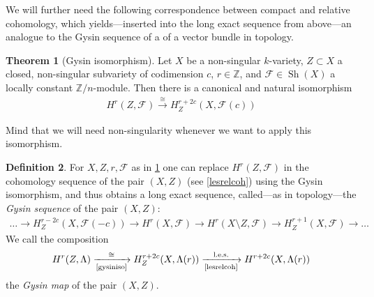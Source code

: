 \documentclass[english]{scrartcl}
\theoremstyle{definition}
\newtheorem{Def}{Definition}[section]
\newtheorem{Thm}[Def]{Theorem}
\theoremstyle{remark}
\newcommand*{\Z}{\mathds{Z}}
\newcommand*{\Zmod}[1]{\Z/#1} %
\newcommand*{\F}{\mathcal{F}} %
\DeclareMathOperator{\Sh}{Sh} %
\begin{document}
We will further need the following correspondence between compact and
relative cohomology, which yields---inserted into the long exact
sequence from above---an analogue to the Gysin sequence of a of a
vector bundle in topology.
\begin{Thm}[Gysin isomorphism]\label{gysiniso}
  Let $X$ be a non-singular $k$-variety,
  $Z\subset X$ a closed, non-singular subvariety of codimension $c$,
  $r\in\Z$,
  and $\F\in\Sh(X)$ a locally constant $\Zmod{n}$-module.
  Then there is a canonical and natural isomorphism
  \begin{gather*}
    H^{r}\left(Z,\F\right)
    \xrightarrow{\cong}
    H_Z^{r+2c}\left(X,\F(c)\right)
  \end{gather*}    
\end{Thm}
Mind that we will need non-singularity whenever we want to apply
this isomorphism.
\begin{Def}
  For $X,Z,r,\F$ as in \ref{gysiniso} one can replace
  $H^{r}(Z,\F)$ in the cohomology sequence of the pair
  $(X,Z)$ (see \ref{lesrelcoh}) using the Gysin isomorphism, and thus
  obtains a long exact sequence, called---as in topology---the
  \emph{Gysin sequence} of the pair $(X,Z)$:
  \begin{gather*}
    \dotsc
    \to H_Z^{r-2c}\left(X,\F(-c)\right)
    \to H^r(X,\F)
    \to H^r(X\setminus Z,\F)
    \to H_Z^{r+1}(X,\F)
    \to \dotsc    
  \end{gather*}
  We call the composition
  \begin{gather*}
    H^r(Z,\Lambda)
    \xrightarrow[\text{\ref{gysiniso}}]{\cong}
    H_Z^{r+2c}(X,\Lambda(r))
    \xrightarrow[\text{\ref{lesrelcoh}}]{\text{l.e.s.}}
    H^{r+2c}(X,\Lambda(r))
  \end{gather*}
  the \emph{Gysin map} of the pair $(X,Z)$.
\end{Def}
\end{document}
